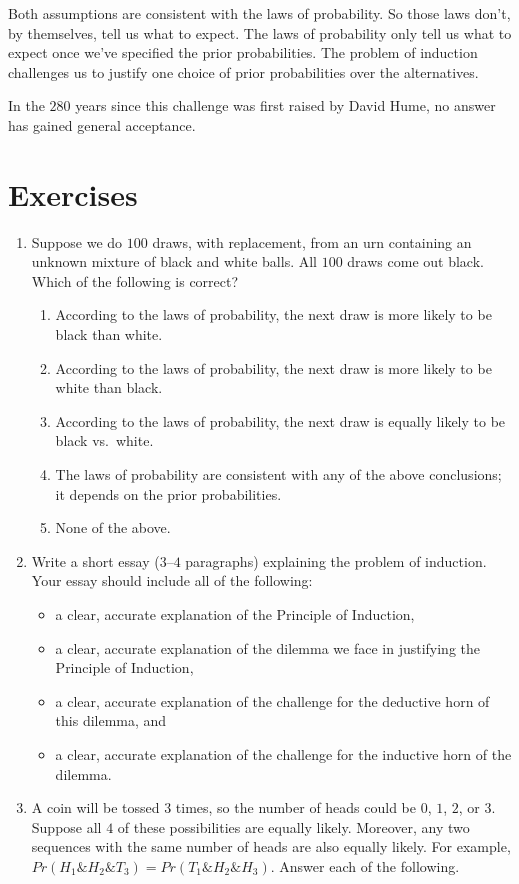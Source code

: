\documentclass[justified]{tufte-book}
\providecommand{\tightlist}{%
  \setlength{\itemsep}{0pt}\setlength{\parskip}{0pt}}
\renewcommand{\wedge}{\mathbin{\&}}
\newcommand{\p}{Pr}
\theoremstyle{definition}
\theoremstyle{definition}
\theoremstyle{definition}
\theoremstyle{definition}
\theoremstyle{remark}
\begin{document}
Both assumptions are consistent with the laws of probability. So those laws don't, by themselves, tell us what to expect. The laws of probability only tell us what to expect once we've specified the prior probabilities. The problem of induction challenges us to justify one choice of prior probabilities over the alternatives.

In the \(280\) years since this challenge was first raised by David Hume, no answer has gained general acceptance.

\hypertarget{exercises-20}{%
\section*{Exercises}\label{exercises-20}}

\begin{enumerate}
\def\labelenumi{\arabic{enumi}.}
\item
  Suppose we do \(100\) draws, with replacement, from an urn containing an unknown mixture of black and white balls. All \(100\) draws come out black. Which of the following is correct?

  \begin{enumerate}
  \def\labelenumii{\alph{enumii}.}
  \tightlist
  \item
    According to the laws of probability, the next draw is more likely to be black than white.
  \item
    According to the laws of probability, the next draw is more likely to be white than black.
  \item
    According to the laws of probability, the next draw is equally likely to be black vs.~white.
  \item
    The laws of probability are consistent with any of the above conclusions; it depends on the prior probabilities.
  \item
    None of the above.
  \end{enumerate}
\item
  Write a short essay (\(3\)--\(4\) paragraphs) explaining the problem of induction. Your essay should include all of the following:

  \begin{itemize}
  \tightlist
  \item
    a clear, accurate explanation of the Principle of Induction,
  \item
    a clear, accurate explanation of the dilemma we face in justifying the Principle of Induction,
  \item
    a clear, accurate explanation of the challenge for the deductive horn of this dilemma, and
  \item
    a clear, accurate explanation of the challenge for the inductive horn of the dilemma.
  \end{itemize}
\item
  A coin will be tossed \(3\) times, so the number of heads could be \(0\), \(1\), \(2\), or \(3\). Suppose all \(4\) of these possibilities are equally likely. Moreover, any two sequences with the same number of heads are also equally likely. For example, \(\p(H_1 \wedge H_2 \wedge T_3) = \p(T_1 \wedge H_2 \wedge H_3)\). Answer each of the following.


\end{enumerate}
\end{document}
